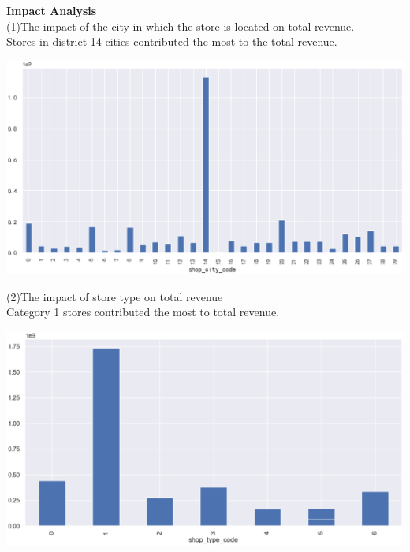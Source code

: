  \textbf{Impact Analysis}\\
(1)The impact of the city in which the store is located on total revenue.\\
Stores in district 14 cities contributed the most to the total revenue.
\begin{center}

  \begin{minipage}{0.5\linewidth}
  \centering

  \includegraphics[width=1.1\textwidth]{logos/scity.eps}
  

  \end{minipage}
\end{center}
(2)The impact of store type on total revenue\\
Category 1 stores contributed the most to total revenue.\\
\begin{center}

  \begin{minipage}{0.7\linewidth}
  \centering

  \includegraphics[width=1.0\textwidth]{logos/slei.eps}
  

  \end{minipage}
\end{center}



